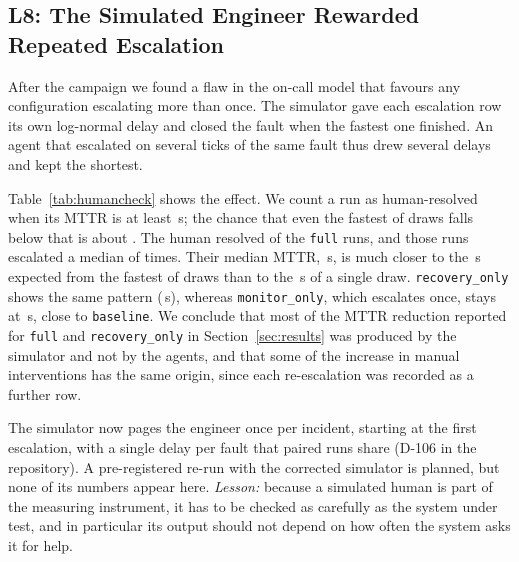\subsection{L8: The Simulated Engineer Rewarded Repeated Escalation}\label{sec:humanartifact}
After the campaign we found a flaw in the on-call model that favours any configuration escalating
more than once. The simulator gave each escalation row its own log-normal delay and closed the fault
when the fastest one finished. An agent that escalated on several ticks of the same fault thus drew
several delays and kept the shortest.

\begin{table}[t]
\centering
\caption{Human-Resolved Runs (``Human''), Their Median Escalations and MTTR (s), and the Median
  Fastest of That Many Simulated-Human Draws (s)}
\label{tab:humancheck}
\scriptsize
\setlength{\tabcolsep}{3pt}

\end{table}

Table~\ref{tab:humancheck} shows the effect. We count a run as human-resolved when its MTTR is at
least \NHumanResolvedMin{}\,s; the chance that even the fastest of \NHumanEscalationsMax{} draws
falls below that is about \NHumanFastBelowMinProb{}. The human resolved \NHumanResolvedFull{} of the
\NNFull{} \texttt{full} runs, and those runs escalated a median of \NHumanEscalationsFull{} times.
Their median MTTR, \NHumanMttrFull{}\,s, is much closer to the \NHumanFastestDrawFull{}\,s expected
from the fastest of \NHumanEscalationsFull{} draws than to the \NHumanFastestDrawBaseline{}\,s of a
single draw. \texttt{recovery\_only} shows the same pattern (\NHumanMttrRecoveryOnly{}\,s), whereas
\texttt{monitor\_only}, which escalates once, stays at \NHumanMttrMonitorOnly{}\,s, close to
\texttt{baseline}. We conclude that most of the MTTR reduction reported for \texttt{full} and
\texttt{recovery\_only} in Section~\ref{sec:results} was produced by the simulator and not by the
agents, and that some of the increase in manual interventions has the same origin, since each
re-escalation was recorded as a further row.

The simulator now pages the engineer once per incident, starting at the first escalation, with a
single delay per fault that paired runs share (D-106 in the repository). A pre-registered
re-run with the corrected simulator is planned, but none of its numbers appear here. \emph{Lesson:}
because a simulated human is part of the measuring instrument, it has to be checked as carefully as
the system under test, and in particular its output should not depend on how often the system asks
it for help.
